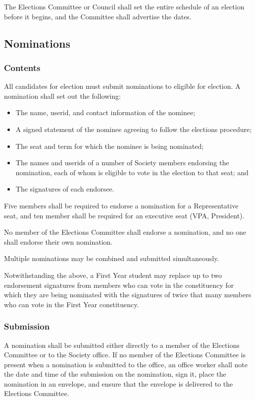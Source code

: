 The Elections Committee or Council shall set the entire schedule of an election
before it begins, and the Committee shall advertise the dates.

\subsection{Nominations}
\subsubsection{Contents}
All candidates for election must submit nominations to eligible for election.
A nomination shall set out the following:
\begin{itemize}
\item The name, userid, and contact information of the nominee;
\item A signed statement of the nominee agreeing to follow the elections
procedure;
\item The seat and term for which the nominee is being nominated;
\item The names and userids of a number of Society members endorsing the
nomination, each of whom is eligible to vote in the election to that seat; and
\item The signatures of each endorsee.
\end{itemize}
Five members shall be required to endorse a nomination for a Representative
seat, and ten member shall be required for an executive seat (VPA, President). 

No member of the Elections Committee
shall endorse a nomination, and no one shall endorse their own nomination.

Multiple nominations may be combined and submitted simultaneously.

Notwithstanding the above, a First Year student may replace up to two
endorsement signatures from members who can vote in the constituency for which
they are being nominated with the signatures of twice that many members who can
vote in the First Year constituency.
\subsubsection{Submission}
A nomination shall be submitted either directly to a member of the Elections
Committee or to the Society office. If no member of the Elections Committee is
present when a nomination is submitted to the office, an office worker shall
note the date and time of the submission on the nomination, sign it, place the
nomination in an envelope, and ensure that the envelope is delivered to the
Elections Committee.

